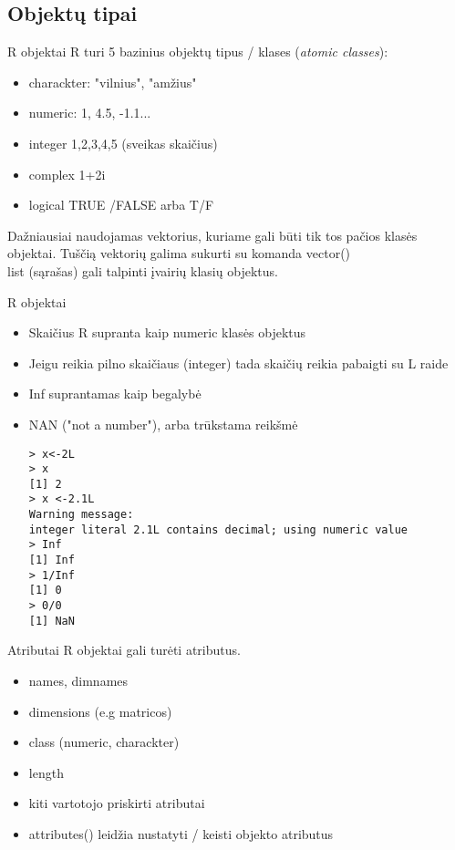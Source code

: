 \documentclass[11pt,xcolor=table]{beamer}
\begin{document}
\subsection{Objektų tipai}

\begin{frame}[fragile]{R objektai}
R turi 5 bazinius objektų tipus / klases (\textit{atomic classes}):
\begin{itemize}
\item charackter: "vilnius", "amžius"
\item numeric: 1, 4.5, -1.1...
\item integer 1,2,3,4,5 (sveikas skaičius)
\item complex 1+2i
\item logical TRUE /FALSE arba T/F
\end{itemize}
Dažniausiai naudojamas vektorius, kuriame gali būti tik tos pačios klasės objektai. Tuščią vektorių galima sukurti su komanda vector()\\
list (sąrašas) gali talpinti įvairių klasių objektus.
\end{frame}


\begin{frame}[fragile]{R objektai}
\begin{itemize}
\item Skaičius R supranta kaip numeric klasės objektus
\item Jeigu reikia pilno skaičiaus (integer) tada skaičių reikia pabaigti su L raide 
\item Inf suprantamas kaip begalybė
\item NAN ("not a number"), arba  trūkstama reikšmė
\begin{lstlisting}
> x<-2L
> x
[1] 2
> x <-2.1L
Warning message:
integer literal 2.1L contains decimal; using numeric value 
> Inf
[1] Inf
> 1/Inf
[1] 0
> 0/0
[1] NaN
\end{lstlisting}
\end{itemize}
\end{frame}


\begin{frame}[fragile]{Atributai}
R objektai gali turėti atributus.
\begin{itemize}
\item names, dimnames
\item dimensions (e.g matricos)
\item class (numeric, charackter)
\item length
\item kiti vartotojo priskirti atributai
\item attributes() leidžia nustatyti / keisti objekto atributus
\end{itemize}
\end{frame}
\end{document}
